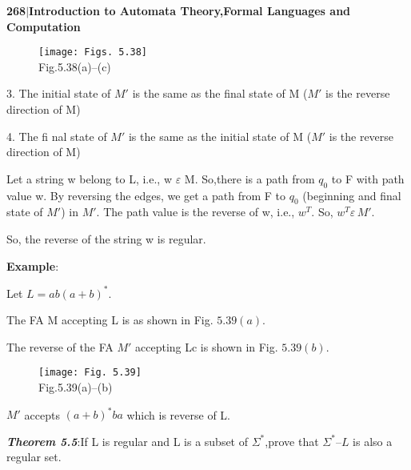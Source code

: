 \documentclass[10pt,a4paper]{book}
\begin{document}
\footnotesize

\begin{flushleft}
  \textbf{\textsf{268}$|$\textsf{Introduction to Automata Theory,Formal Languages and Computation}}
\end{flushleft}


\begin{figure}[h]
  \centering
  \texttt{[image: Figs. 5.38]}\\Fig.5.38(a)–(c)
\end{figure}



\begin{flushleft}
  3. The initial state of $M\prime$ is the same as the final state of M ($M\prime$ is the reverse direction of M)

4. The fi nal state of $M\prime$ is the same as the initial state of M ($M\prime$ is the reverse direction of M)
\end{flushleft}

\begin{flushleft}
\qquad Let a string w belong to L, i.e., w $\varepsilon$ M. So,there is a path from $q_{0}$ to F with path value w. By reversing the edges, we get a path from F to $q_{0}$ (beginning and final state of $M\prime$) in $M\prime$. The path value is the reverse of w, i.e., $w^{T}$. So, $w^{T} \varepsilon\, M\prime$.
\end{flushleft}


So, the reverse of the string w is regular.

\begin{flushleft}
  \textrm{\textbf{Example}}:

Let $L = ab(a + b)^{*}$.
\end{flushleft}

The FA M accepting L is as shown in Fig. $5.39(a)$.

The reverse of the FA $M\prime$ accepting Lc is shown in Fig. $5.39(b)$.

\begin{figure}[h]
  \centering
  \texttt{[image: Fig. 5.39]}\\ Fig.5.39(a)–(b)
\end{figure}


$M\prime$ accepts $(a + b)^{*}ba$ which is reverse of L.

\begin{flushleft}
  \emph{\textbf{Theorem 5.5}}:If L is regular and L is a subset of $\Sigma^{*}$,prove that $\Sigma^{*} – L$ is also a regular set.
\end{flushleft}
\end{document}

